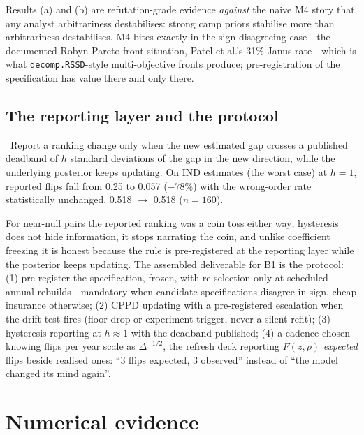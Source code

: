Results (a) and (b) are refutation-grade evidence \emph{against} the naive M4 story that any analyst arbitrariness destabilises: strong camp priors stabilise more than arbitrariness destabilises. M4 bites exactly in the sign-disagreeing case---the documented Robyn Pareto-front situation, Patel et al.'s 31\% Janus rate---which is what \texttt{decomp.RSSD}-style multi-objective fronts produce; pre-registration of the specification has value there and only there.

\subsection{The reporting layer and the protocol}

\begin{construction}
\label{refresh:con:hysteresis}
\tagNumerical\ Report a ranking change only when the new estimated gap crosses a published deadband of $h$ standard deviations of the gap in the new direction, while the underlying posterior keeps updating. On IND estimates (the worst case) at $h = 1$, reported flips fall from 0.25 to 0.057 ($-78\%$) with the wrong-order rate statistically unchanged, 0.518 $\to$ 0.518 ($n = 160$).
\end{construction}

For near-null pairs the reported ranking was a coin toss either way; hysteresis does not hide information, it stops narrating the coin, and unlike coefficient freezing it is honest because the rule is pre-registered at the reporting layer while the posterior keeps updating. The assembled deliverable for B1 is the protocol: (1) pre-register the specification, frozen, with re-selection only at scheduled annual rebuilds---mandatory when candidate specifications disagree in sign, cheap insurance otherwise; (2) CPPD updating with a pre-registered escalation when the drift test fires (floor drop or experiment trigger, never a silent refit); (3) hysteresis reporting at $h \approx 1$ with the deadband published; (4) a cadence chosen knowing flips per year scale as $\Delta^{-1/2}$, the refresh deck reporting $F(z, \rho)$ \emph{expected} flips beside realised ones: ``3 flips expected, 3 observed'' instead of ``the model changed its mind again''.

\section{Numerical evidence}
\label{refresh:sec:numerics}

